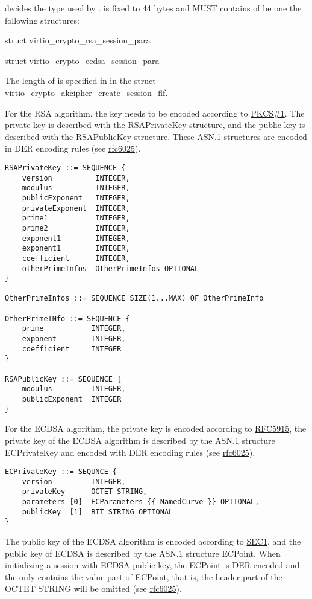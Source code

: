  decides the type used by .
 is fixed to 44 bytes and MUST contains of be one the
following structures:
\begin{itemize*}
\item struct virtio_crypto_rsa_session_para
\item struct virtio_crypto_ecdsa_session_para
\end{itemize*}

The length of  is specified in  in the struct
virtio_crypto_akcipher_create_session_flf.

For the RSA algorithm, the key needs to be encoded according to
\hyperref[intro:rfc3447]{PKCS\#1}. The private key is described with the
RSAPrivateKey structure, and the public key is described with the RSAPublicKey
structure. These ASN.1 structures are encoded in DER encoding rules (see
\hyperref[intro:rfc6025]{rfc6025}).

\begin{lstlisting}
RSAPrivateKey ::= SEQUENCE {
    version          INTEGER,
    modulus          INTEGER,
    publicExponent   INTEGER,
    privateExponent  INTEGER,
    prime1           INTEGER,
    prime2           INTEGER,
    exponent1        INTEGER,
    exponent1        INTEGER,
    coefficient      INTEGER,
    otherPrimeInfos  OtherPrimeInfos OPTIONAL
}

OtherPrimeInfos ::= SEQUENCE SIZE(1...MAX) OF OtherPrimeInfo

OtherPrimeINfo ::= SEQUENCE {
    prime           INTEGER,
    exponent        INTEGER,
    coefficient     INTEGER
}

RSAPublicKey ::= SEQUENCE {
    modulus         INTEGER,
    publicExponent  INTEGER
}
\end{lstlisting}

For the ECDSA algorithm, the private key is encoded according to
\hyperref[intro:rfc5915]{RFC5915}, the private key of the ECDSA algorithm
is described by the ASN.1 structure ECPrivateKey and encoded with DER
encoding rules (see \hyperref[intro:rfc6025]{rfc6025}).

\begin{lstlisting}
ECPrivateKey ::= SEQUNCE {
    version         INTEGER,
    privateKey      OCTET STRING,
    parameters [0]  ECParameters {{ NamedCurve }} OPTIONAL,
    publicKey  [1]  BIT STRING OPTIONAL
}
\end{lstlisting}

The public key of the ECDSA algorithm is encoded according to \hyperref[intro:SEC1]{SEC1},
and the public key of ECDSA is described by the ASN.1 structure ECPoint.
When initializing a session with ECDSA public key, the ECPoint is DER encoded and the
 only contains the value part of ECPoint, that is, the header part of the
OCTET STRING will be omitted (see \hyperref[intro:rfc6025]{rfc6025}).

